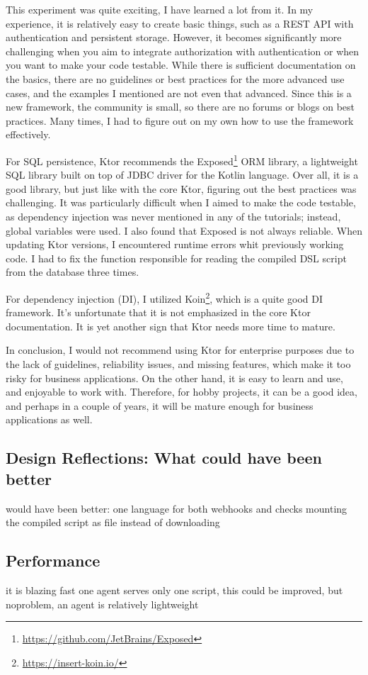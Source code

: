 This experiment was quite exciting, I have learned a lot from it. In my experience, it is relatively easy to create basic things, such as a REST API with authentication and persistent storage. However, it becomes significantly more challenging when you aim to integrate authorization with authentication or when you want to make your code testable. While there is sufficient documentation on the basics, there are no guidelines or best practices for the more advanced use cases, and the examples I mentioned are not even that advanced. Since this is a new framework, the community is small, so there are no forums or blogs on best practices. Many times, I had to figure out on my own how to use the framework effectively.

For SQL persistence, Ktor recommends the Exposed\footnote{\url{https://github.com/JetBrains/Exposed}} ORM library, a lightweight SQL library built on top of JDBC driver for the Kotlin language. Over all, it is a good library, but just like with the core Ktor, figuring out the best practices was challenging. It was particularly difficult when I aimed to make the code testable, as dependency injection was never mentioned in any of the tutorials; instead, global variables were used. I also found that Exposed is not always reliable. When updating Ktor versions, I encountered runtime errors whit previously working code. I had to fix the function responsible for reading the compiled DSL script from the database three times.

For dependency injection (DI), I utilized Koin\footnote{\url{https://insert-koin.io/}}, which is a quite good DI framework. It's unfortunate that it is not emphasized in the core Ktor documentation. It is yet another sign that Ktor needs more time to mature.

In conclusion, I would not recommend using Ktor for enterprise purposes due to the lack of guidelines, reliability issues, and missing features, which make it too risky for business applications. On the other hand, it is easy to learn and use, and enjoyable to work with. Therefore, for hobby projects, it can be a good idea, and perhaps in a couple of years, it will be mature enough for business applications as well.

\subsection[Design Reflections]{Design Reflections: What could have been better}

would have been better: 
        one language for both webhooks and checks
        mounting the compiled script as file instead of downloading

\subsection{Performance}

it is blazing fast
one agent serves only one script, this could be improved, but noproblem, an agent is relatively lightweight

